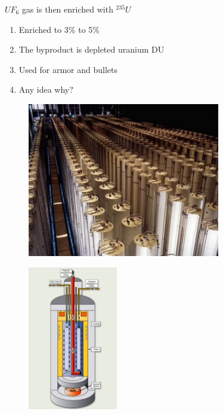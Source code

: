 \documentclass[aspectratio=1610,pdftex,dvipsnames,compress,xcolor={dvipsnames}]{beamer}
\begin{document}
\addtocounter{framenumber}{-1} 
\begin{frame}{$UF_6$ gas is then enriched with $^{235}U$}
    \begin{enumerate}[series=outerlist,topsep=0pt,itemsep=21pt,leftmargin=*,label=(\arabic*)]
        \item[]Enriched to 3\% to 5\%
        \item[]The byproduct is depleted uranium DU
        \item[]Used for armor and bullets
        \item[]Any idea why?
    \end{enumerate}
\end{frame}


\begin{frame}{}
    \begin{figure}
        \centering
        \includegraphics[width=0.75\textwidth]{centrifuges.jpg}
    \end{figure}
\end{frame}


\begin{frame}{}
    \begin{figure}
        \centering
        \includegraphics[width=0.35\textwidth]{centrifuge.jpg}
    \end{figure}
\end{frame}
\end{document}
